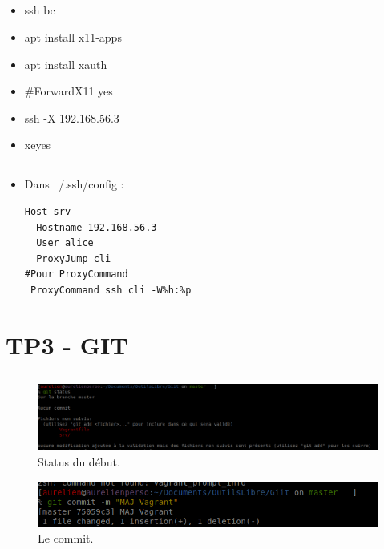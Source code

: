 \documentclass{article}
\begin{document}
\subsection{}
\begin{itemize}
    \item ssh bc
    \item apt install x11-apps
    \item apt install xauth
    \item \#ForwardX11 yes
    \item ssh -X 192.168.56.3
    \item xeyes
\end{itemize}
\subsection{}
\begin{itemize}
    \item Dans ~/.ssh/config :
\begin{lstlisting}
Host srv
  Hostname 192.168.56.3
  User alice
  ProxyJump cli
#Pour ProxyCommand
 ProxyCommand ssh cli -W%h:%p
\end{lstlisting}
\end{itemize}

\newpage

\section{TP3 - GIT}

\subsection{}


\begin{figure}[h]
\centering
\includegraphics[width=\textwidth]{screen/git1.png}
\caption{\label{fig:frog}Status du début.}
\end{figure}

\begin{figure}[h]
\centering
\includegraphics[width=0.7\columnwidth]{screen/git2.png}
\caption{\label{fig:frog}Le commit.}
\end{figure}
\end{document}
